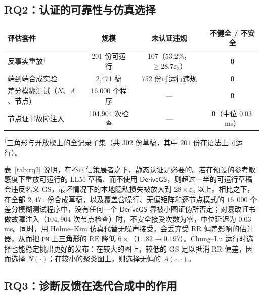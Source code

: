 \documentclass[11pt]{article}
\theoremstyle{ieeeitalic}
\newcommand{\GS}{\mathrm{GS}}
\newcommand{\RE}{\mathrm{RE}}
\newcommand{\DeriveGS}{\mathsf{DeriveGS}}
\begin{document}
\subsection{RQ2：认证的可靠性与仿真选择}
\label{sec:rq2}

\begin{center}
\label{tab:rq2}
\vspace{0.35em}
{\footnotesize
\setlength{\tabcolsep}{6pt}
\renewcommand{\arraystretch}{1.08}
\begin{tabular}{lccc}
\toprule
\textbf{评估套件} & \textbf{规模} & \textbf{未认证违规} & \textbf{不健全 / 不安全} \\
\midrule
反事实重放$^\dagger$ & 201 份可运行 & 107（53.2\%，$\ge 28.7\varepsilon_3$） & \textbf{0} \\
端到端合成实验 & 2{,}471 稿 & 752 份可运行违规 & \textbf{0} \\
差分模糊测试（$N$、$A$、节点） & 16{,}000 个程序 & --- & \textbf{0} \\
节点证书故障注入 & 104{,}904 次检查 & --- & \textbf{0}（中位 0.03\,ms） \\
\bottomrule
\end{tabular}
\par\vspace{2pt}
{\raggedright\scriptsize $^\dagger$三角形与开放楔上的全记录子集（共 $302$ 份草稿，其中 $201$ 份在语法上可运行）。\par}
}
\end{center}

表~\ref{tab:rq2} 说明，在不可信策展者之下，静态认证是必要的。若在预设的参考敏感度下重放可运行的 LLM 草稿、而不使用 $\DeriveGS$，则超过一半的可运行草稿会违反名义 $\GS$，最坏情况下的本地隐私损失被放大到 $28\times \varepsilon_3$ 以上。相比之下，在全部 $2{,}471$ 份合成草稿，以及覆盖含噪行、无偏矩阵和逐节点模式的 $16{,}000$ 个差分模糊测试程序中，没有任何一个 $\DeriveGS$ 界被小图证伪所否定；对篡改证书做故障注入（$104{,}904$ 次节点检查）时，不安全接受次数为零，中位延迟为 $0.03$\,ms。同时，用 Holme--Kim 仿真代替无噪声接受，会丢弃受 RR 偏差影响的估计器，从而把 \texttt{PM} 上\textbf{三角形}的 $\RE$ 降低 $6\times$（$1.182 \to 0.197$）。Chung--Lu 运行时选择也能稳定挑出更好的发布：在较大的图上，较低的 $\GS$ 足以抵消 RR 偏差，因而选择 $N(\cdot)$；在较小的聚类图上，则选择无偏的 $A(\cdot,\cdot)$。

\subsection{RQ3：诊断反馈在迭代合成中的作用}
\label{sec:rq3}
\end{document}
